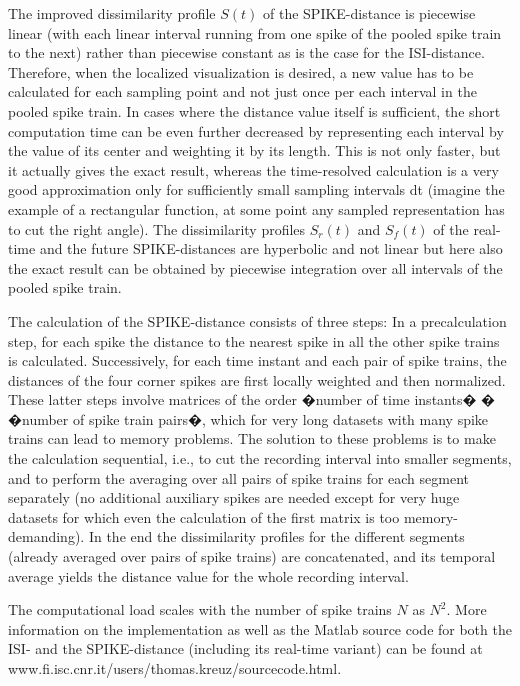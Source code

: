 \documentclass[10pt,twocolumn]{elsart5p}
\begin{document}
The improved dissimilarity profile $S (t)$ of the SPIKE-distance is piecewise linear (with each linear interval running from one spike of the pooled spike train to the next) rather than piecewise constant as is the case for the ISI-distance.
Therefore, when the localized visualization is desired, a new value has to be calculated for each sampling point and not just once per each interval in the pooled spike train. In cases where the distance value itself is sufficient, the short computation time can be even further decreased by representing each interval by the value of its center and weighting it by its length. This is not only faster, but it actually gives the exact result, whereas the time-resolved calculation is a very good approximation only for sufficiently small sampling intervals dt (imagine the example of a rectangular function, at some point any sampled representation has to cut the right angle). The dissimilarity profiles $S_r(t)$ and $S_f (t)$ of the real-time and the future SPIKE-distances are hyperbolic and not linear but here also the exact result can be obtained by piecewise integration over all intervals of the pooled spike train.

The calculation of the SPIKE-distance consists of three steps: In a precalculation step, for each spike the distance to the nearest spike in all the other spike trains is calculated. Successively, for each time instant and each pair of spike trains, the distances of the four corner spikes are first locally weighted and then normalized. These latter steps involve
matrices of the order �number of time instants� � �number of spike train pairs�, which for very long datasets with many spike trains can lead to memory problems. The solution to these problems is to make the calculation sequential, i.e., to cut the recording interval into smaller segments, and to perform the averaging over all pairs of spike trains for
each segment separately (no additional auxiliary spikes are needed except for very huge datasets for which even the calculation of the first matrix is too memory-demanding). In the end the dissimilarity profiles for the different segments (already averaged over pairs of spike trains) are concatenated, and its temporal average yields the distance value for the whole recording interval.

The computational load scales with the number of spike trains $N$ as $N^2$. More information on the implementation as well as the Matlab source code for both the ISI- and the SPIKE-distance (including its real-time variant) can be found at www.fi.isc.cnr.it/users/thomas.kreuz/sourcecode.html.
\end{document}
